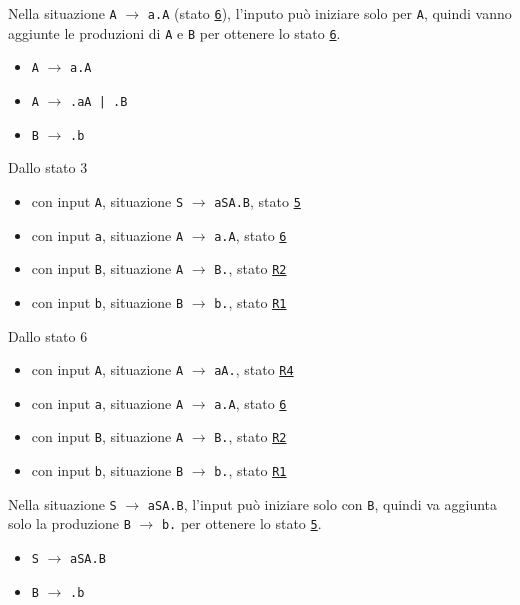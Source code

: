 Nella situazione \texttt{A} $\rightarrow$ \texttt{a.A} (stato \texttt{\underline{6}}), l'inputo può iniziare solo per \texttt{A}, quindi vanno aggiunte le produzioni di \texttt{A} e \texttt{B} per ottenere lo stato \texttt{\underline{6}}.
\begin{itemize}
    \item \texttt{A} $\rightarrow$ \texttt{a.A}
    \item \texttt{A} $\rightarrow$ \texttt{.aA | .B}
    \item \texttt{B} $\rightarrow$ \texttt{.b}
\end{itemize}
\setlist{}
Dallo stato 3
\begin{itemize}
    \item con input \texttt{A}, situazione \texttt{S} $\rightarrow$ \texttt{aSA.B}, stato \texttt{\underline{5}}
    \item con input \texttt{a}, situazione \texttt{A} $\rightarrow$ \texttt{a.A}, stato \texttt{\underline{6}}
    \item con input \texttt{B}, situazione \texttt{A} $\rightarrow$ \texttt{B.}, stato \texttt{\underline{R2}}
    \item con input \texttt{b}, situazione \texttt{B} $\rightarrow$ \texttt{b.}, stato \texttt{\underline{R1}}
\end{itemize}
Dallo stato 6
\begin{itemize}
    \item con input \texttt{A}, situazione \texttt{A} $\rightarrow$ \texttt{aA.}, stato \texttt{\underline{R4}}
    \item con input \texttt{a}, situazione \texttt{A} $\rightarrow$ \texttt{a.A}, stato \texttt{\underline{6}}
    \item con input \texttt{B}, situazione \texttt{A} $\rightarrow$ \texttt{B.}, stato \texttt{\underline{R2}}
    \item con input \texttt{b}, situazione \texttt{B} $\rightarrow$ \texttt{b.}, stato \texttt{\underline{R1}}
\end{itemize}

Nella situazione \texttt{S} $\rightarrow$ \texttt{aSA.B}, l'input può iniziare solo con \texttt{B}, quindi va aggiunta solo la produzione \texttt{B} $\rightarrow$ \texttt{b.} per ottenere lo stato \texttt{\underline{5}}.
\begin{itemize}
    \item \texttt{S} $\rightarrow$ \texttt{aSA.B}
    \item \texttt{B} $\rightarrow$ \texttt{.b}
\end{itemize}
\setlist{}

